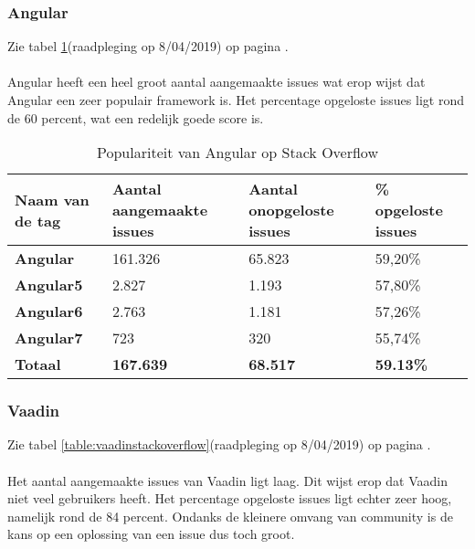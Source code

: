 \subsubsection{Angular}
Zie tabel \ref{table:angularstackoverflow}(raadpleging op 8/04/2019) op pagina \pageref{table:angularstackoverflow}. \\ \\
Angular heeft een heel groot aantal aangemaakte issues wat erop wijst dat Angular een zeer populair framework is. Het percentage opgeloste issues ligt rond de 60 percent, wat een redelijk goede score is.
\begin{table}[H]
	\begin{tabular}{|l|l|l|l|}
		\hline
		Naam van de tag   & \textbf{Aantal aangemaakte issues} & \textbf{Aantal onopgeloste issues} & \textbf{\% opgeloste issues} \\ \hline
		\textbf{Angular}  & 161.326                            & 65.823                             & 59,20\%                              \\ \hline
		\textbf{Angular5} & 2.827                              & 1.193                              & 57,80\%                              \\ \hline
		\textbf{Angular6} & 2.763                              & 1.181                              & 57,26\%                              \\ \hline
		\textbf{Angular7} & 723                                & 320                                & 55,74\%                              \\ \hline
		\textbf{Totaal}   & \textbf{167.639}                   & \textbf{68.517}                    & \textbf{59.13\%}                     \\ \hline
	\end{tabular}
\caption{Populariteit van Angular op Stack Overflow}
\label{table:angularstackoverflow}
\end{table}
\subsubsection{Vaadin}
Zie tabel \ref{table:vaadinstackoverflow}(raadpleging op 8/04/2019) op pagina \pageref{table:vaadinstackoverflow}. \\ \\
Het aantal aangemaakte issues van Vaadin ligt laag. Dit wijst erop dat Vaadin niet veel gebruikers heeft. Het percentage opgeloste issues ligt echter zeer hoog, namelijk rond de 84 percent. Ondanks de kleinere omvang van community is de kans op een oplossing van een issue dus toch groot. \\


